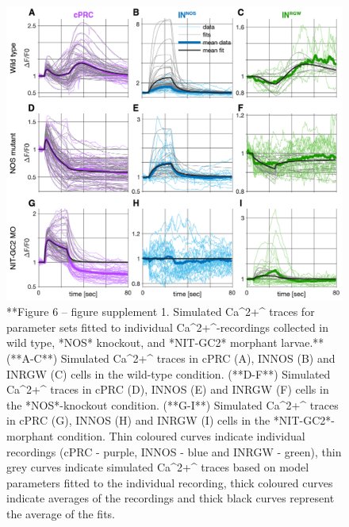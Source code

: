 \documentclass[
  10pt,
  onecolumn]{article}
\begin{document}
\begin{figure}
\includegraphics[width=26.25in]{figures/Figure6_fig_Suppl1} \caption{**Figure 6 -- figure supplement 1. Simulated Ca^2+^ traces for parameter sets fitted to individual Ca^2+^-recordings collected in wild type, *NOS* knockout, and *NIT-GC2* morphant larvae.** (**A-C**) Simulated Ca^2+^ traces in cPRC (A), INNOS (B) and INRGW (C) cells in the wild-type condition. (**D-F**) Simulated Ca^2+^ traces in cPRC (D), INNOS (E) and INRGW (F) cells in the *NOS*-knockout condition. (**G-I**) Simulated Ca^2+^ traces in cPRC (G), INNOS (H) and INRGW (I) cells in the *NIT-GC2*-morphant condition. Thin coloured curves indicate individual recordings (cPRC - purple, INNOS - blue and INRGW - green), thin grey curves indicate simulated Ca^2+^ traces based on model parameters fitted to the individual recording, thick coloured curves indicate averages of the recordings and thick black curves represent the average of the fits. }\label{fig:unnamed-chunk-20}
\end{figure}
\end{document}
